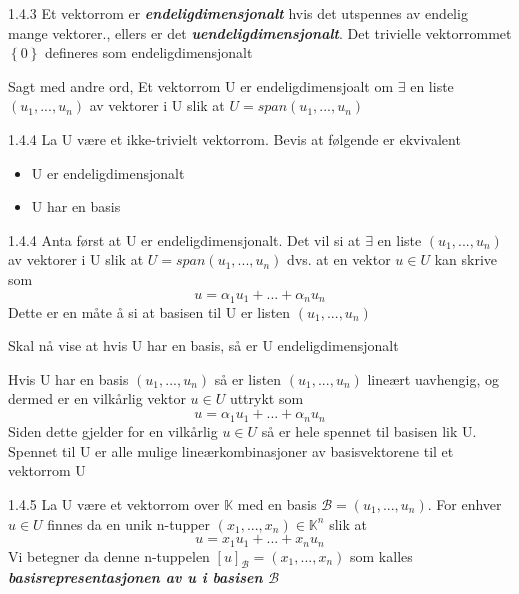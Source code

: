 \documentclass[a4paper,norsk]{article}
\begin{document}
\begin{definitionbox}{1.4.3}{}
Et vektorrom er \textbf{\textit{endeligdimensjonalt}} hvis det utspennes av endelig mange vektorer., ellers er det \textbf{\textit{uendeligdimensjonalt}}. Det trivielle vektorrommet $ \left\{ 0 \right\}  $ defineres som endeligdimensjonalt

Sagt med andre ord, Et vektorrom U er endeligdimensjoalt om $ \exists $ en liste $ \left( u_1, ..., u_n \right)  $ av vektorer i U slik at $ U = span \left( u_1, ..., u_n \right)  $ 
\end{definitionbox}

\begin{oppgavebox}{1.4.4}{}
La U være et ikke-trivielt vektorrom. Bevis at følgende er ekvivalent
\begin{itemize}
    \item U er endeligdimensjonalt
    \item U har en basis
\end{itemize}

\begin{proofbox}{1.4.4}{}
Anta først at U er endeligdimensjonalt. Det vil si at $ \exists  $ en liste $ \left( u_1, ..., u_n \right)  $ av vektorer i U slik at $ U = span \left( u_1, ..., u_n \right)  $ dvs. at en vektor $ u \in U $ kan skrive som
\[
    u = \alpha_{1}^{} u_1 + ... + \alpha_{n}^{} u_n
\]
Dette er en måte å si at basisen til U er listen $ \left( u_1, ..., u_n \right)  $ 

Skal nå vise at hvis U har en basis, så er U endeligdimensjonalt

Hvis U har en basis $ \left( u_1, ..., u_n \right)  $ så er listen $ \left( u_1, ..., u_n \right) $ lineært uavhengig, og dermed er en vilkårlig vektor $ u \in U $ uttrykt som
\[
    u = \alpha_{1}^{} u_1 + ... + \alpha_{n}^{} u_n
\]
Siden dette gjelder for en vilkårlig $ u \in U $ så er hele spennet til basisen lik U. Spennet til U er alle mulige lineærkombinasjoner av basisvektorene til et vektorrom U
\end{proofbox}
\end{oppgavebox}

\begin{theorembox}{1.4.5}{}
La U være et vektorrom over $ \mathbb{K} $ med en basis $ \mathcal{B} = \left( u_1, ..., u_n \right)  $. For enhver $ u \in U $ finnes da en unik n-tupper $ \left( x_1, ..., x_n \right) \in \mathbb{K}^n  $ slik at 
\[
    u = x_1 u_1 + ... + x_n u_n
\]
Vi betegner da denne n-tuppelen $ \left[ u \right] _{\mathcal{B}} = \left( x_1, ..., x_n \right)  $ som kalles \textbf{\textit{basisrepresentasjonen av u i basisen $ \mathcal{B} $ }}
\end{theorembox}
\end{document}
